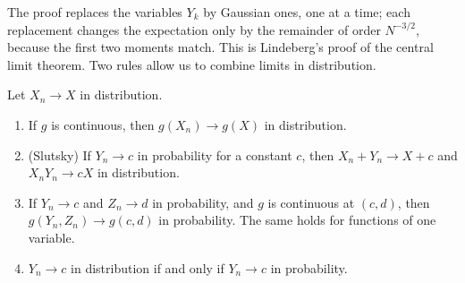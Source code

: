 The proof replaces the variables $Y_k$ by Gaussian ones, one at a time; each replacement changes the expectation only by the remainder of order $N^{-3/2}$, because the first two moments match. This is Lindeberg's proof of the central limit theorem. Two rules allow us to combine limits in distribution.

\begin{theorem}\label{L4-thm:slutsky}
    Let $X_n \to X$ in distribution.
    \begin{enumerate}
        \item If $g$ is continuous, then $g(X_n) \to g(X)$ in distribution.
        \item (Slutsky) If $Y_n \to c$ in probability for a constant $c$, then $X_n + Y_n \to X + c$ and $X_nY_n \to cX$ in distribution.
        \item If $Y_n \to c$ and $Z_n \to d$ in probability, and $g$ is continuous at $(c, d)$, then $g(Y_n, Z_n) \to g(c, d)$ in probability. The same holds for functions of one variable.
        \item $Y_n \to c$ in distribution if and only if $Y_n \to c$ in probability.
    \end{enumerate}
\end{theorem}

